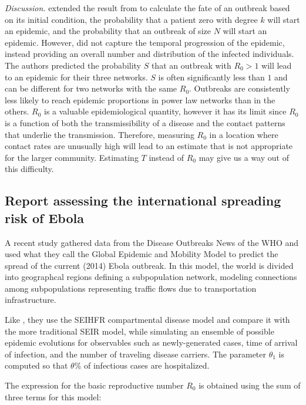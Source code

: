 \documentclass[10pt, journal,onecolumn]{IEEEtran}
\begin{document}
\textit{Discussion.} \citep{meyers2005network} extended the result from \citep{newman2002spread} to calculate the fate
of an outbreak based on its initial condition, the probability that a patient zero with degree $k$ will
start an epidemic, and the probability that an outbreak of size $N$ will start an epidemic. However,
\citep{newman2002spread} did not capture the temporal progression of the epidemic, instead
providing an overall number and distribution of the infected individuals.
The authors predicted the probability $S$
that an outbreak with $R_0>1$ will lead to an epidemic for their three networks. $S$ is often
significantly less than $1$ and can be different for two networks with the same $R_0$. Outbreaks
are consistently less likely to reach epidemic proportions in power law networks than in
the others. $R_0$ is a valuable epidemiological quantity, however it has its limit since $R_0$ is
a function of both the transmissibility of a disease and the contact patterns that underlie the
transmission. Therefore, measuring $R_0$ in a location where contact rates are unusually high will
lead to an estimate that is not appropriate for the larger community. Estimating $T$ instead of
$R_0$ may give us a way out of this difficulty.


\subsection{\textbf{Report assessing the international spreading risk of Ebola \citep{gomes2014assessing}}}

A recent study \citep{gomes2014assessing} gathered data from the Disease Outbreaks News of
the WHO and used what they call the Global Epidemic and Mobility Model to predict the spread of the
current (2014) Ebola outbreak. In this model, the world is divided into geographcal regions defining a
subpopulation network, modeling connections among subpopulations representing traffic flows due to
transportation infrastructure.

Like \citep{legrand2007understanding}, they use the SEIHFR compartmental disease model and compare
it with the more traditional SEIR model, while simulating
an ensemble of possible epidemic evolutions for observables such as newly-generated
cases, time of arrival of infection, and the number of traveling disease carriers.
The parameter $\theta_1$ is computed so that $\theta\%$ of infectious cases
are hospitalized.

The expression for the basic reproductive number $R_0$ is obtained using the sum of three terms
for this model:
\end{document}
